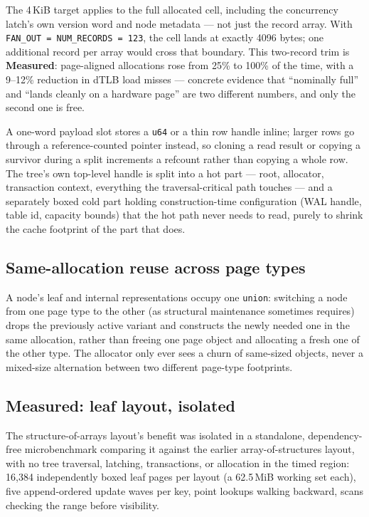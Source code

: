 \documentclass[11pt]{article}
\newcommand{\code}[1]{\texttt{#1}}
\newcommand{\gainmeasured}{\textbf{Measured}}
\begin{document}
The 4\,KiB target applies to the full allocated cell, including the concurrency
latch's own version word and node metadata --- not just the record array. With
\code{FAN\_OUT = NUM\_RECORDS = 123}, the cell lands at exactly 4096 bytes; one
additional record per array would cross that boundary. This two-record trim is
\gainmeasured{}: page-aligned allocations rose from 25\% to 100\% of the time, with a
9--12\% reduction in dTLB load misses --- concrete evidence that ``nominally full''
and ``lands cleanly on a hardware page'' are two different numbers, and only the
second one is free.

A one-word payload slot stores a \code{u64} or a thin row handle inline; larger rows
go through a reference-counted pointer instead, so cloning a read result or copying
a survivor during a split increments a refcount rather than copying a whole row.
The tree's own top-level handle is split into a hot part --- root, allocator,
transaction context, everything the traversal-critical path touches --- and a
separately boxed cold part holding construction-time configuration (WAL handle,
table id, capacity bounds) that the hot path never needs to read, purely to shrink
the cache footprint of the part that does.

\subsection{Same-allocation reuse across page types}

A node's leaf and internal representations occupy one \code{union}: switching a
node from one page type to the other (as structural maintenance sometimes requires)
drops the previously active variant and constructs the newly needed one in the same
allocation, rather than freeing one page object and allocating a fresh one of the
other type. The allocator only ever sees a churn of same-sized objects, never a
mixed-size alternation between two different page-type footprints.

\subsection{Measured: leaf layout, isolated}

The structure-of-arrays layout's benefit was isolated in a standalone,
dependency-free microbenchmark comparing it against the earlier array-of-structures
layout, with no tree traversal, latching, transactions, or allocation in the timed
region: 16,384 independently boxed leaf pages per layout (a 62.5\,MiB working set
each), five append-ordered update waves per key, point lookups walking backward,
scans checking the range before visibility.
\end{document}
